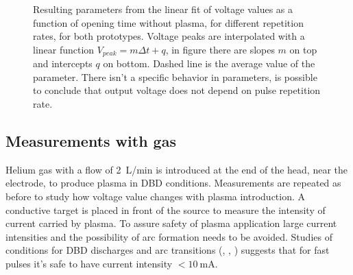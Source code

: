 \begin{figure}
 \centering
 \hfill
 \caption{Resulting parameters from the linear fit of voltage values as a function of opening time without plasma, for different repetition rates, for both prototypes. Voltage peaks are interpolated with a linear function $V_{peak} = m \Delta t + q$, in figure there are slopes $m$ on top and intercepts $q$ on bottom. Dashed line is the average value of the parameter. There isn't a specific behavior in parameters, is possible to conclude that output voltage does not depend on pulse repetition rate.}
 \label{fig:linnogas}
\end{figure}


\subsection{Measurements with gas}
Helium gas with a flow of \SI{2}{\liter/\minute} is introduced at the end of the head, near the electrode, to produce plasma in DBD conditions. Measurements are repeated as before to study how voltage value changes with plasma introduction.
A conductive target is placed in front of the source to measure the intensity of current carried by plasma. To assure safety of plasma application large current intensities and the possibility of arc formation needs to be avoided. Studies of conditions for DBD discharges and arc transitions (\cite{kogelschatz:jpa-00255561}, \cite{TOMAI2006409}, \cite{PhysRev.34.876}) suggests that for fast pulses it's safe to have current intensity $< \SI{10}{\milli\ampere}$.

